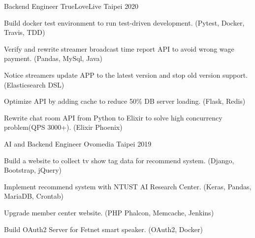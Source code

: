 

\begin{cventries}

  \cventry
    {Backend Engineer} %
    {TrueLoveLive} %
    {Taipei} %
    {2020} %
    {
      \begin{cvitems} %
        \item {Build docker test environment to run test-driven development. (Pytest, Docker, Travis, TDD)}
        \item {Verify and rewrite streamer broadcast time report API to avoid wrong wage payment. (Pandas, MySql, Java)}
        \item {Notice streamers update APP to the latest version and stop old version support. (Elasticsearch DSL)}
        \item {Optimize API by adding cache to reduce 50\% DB server loading. (Flask, Redis)}
        \item {Rewrite chat room API from Python to Elixir to solve high concurrency problem(QPS 3000+). (Elixir Phoenix)}
      \end{cvitems}
    }

  \cventry
    {AI and Backend Engineer} %
    {Ovomedia} %
    {Taipei} %
    {2019} %
    {
      \begin{cvitems} %
        \item {Build a website to collect tv show tag data for recommend system. (Django, Bootstrap, jQuery)}
        \item {Implement recommend system with NTUST AI Research Center. (Keras, Pandas, MariaDB, Crontab)}
        \item {Upgrade member center website. (PHP Phalcon, Memcache, Jenkins)}
        \item {Build OAuth2 Server for Fetnet smart speaker. (OAuth2, Docker)}
      \end{cvitems}
    }

\end{cventries}
